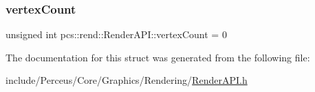 \mbox{\label{structpcs_1_1rend_1_1RenderAPI_a7f970d9c771a1545dc7cc4dc8cd9a257}} 
\subsubsection{\texorpdfstring{vertex\+Count}{vertexCount}}
{\footnotesize\ttfamily unsigned int pcs\+::rend\+::\+Render\+A\+P\+I\+::vertex\+Count = 0\hspace{0.3cm}{\ttfamily [protected]}}



The documentation for this struct was generated from the following file\+:\begin{DoxyCompactItemize}
\item 
include/\+Perceus/\+Core/\+Graphics/\+Rendering/\hyperlink{RenderAPI_8h}{Render\+A\+P\+I.\+h}\end{DoxyCompactItemize}
